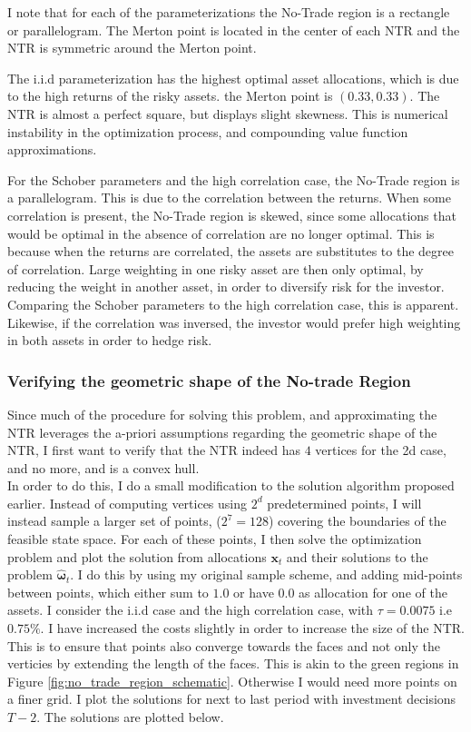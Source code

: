 \documentclass[11pt]{article}
\begin{document}
I note that for each of the parameterizations the No-Trade region is a rectangle or parallelogram.
The Merton point is located in the center of each \ac{NTR} and the \ac{NTR} is symmetric around the Merton point.

The i.i.d parameterization has the highest optimal asset allocations, which is due to the high returns of the risky assets. the Merton point is $(0.33, 0.33)$.
The NTR is almost a perfect square, but displays slight skewness. This is numerical instability in the optimization process, and compounding value function approximations.

For the Schober parameters and the high correlation case,
the No-Trade region is a parallelogram. This is due to the correlation between the returns. When some correlation is present, the No-Trade region is skewed,
since some allocations that would be optimal in the absence of correlation are no longer optimal. 
This is because when the returns are correlated, the assets are substitutes to the degree of correlation. 
Large weighting in one risky asset are then only optimal,
by reducing the weight in another asset, in order to diversify risk for the investor. Comparing the Schober parameters to the high correlation case, this is apparent.
Likewise, if the correlation was inversed, the investor would prefer high weighting in both assets in order to hedge risk. 

\subsubsection{Verifying the geometric shape of the No-trade Region}\label{Subsubsection: ConfirmShape}
Since much of the procedure for solving this problem, and approximating the \ac{NTR} leverages
the a-priori assumptions regarding the geometric shape of the \ac{NTR}, I first want to verify that the
\ac{NTR} indeed has $4$ vertices for the 2d case, and no more, and is a convex hull.\\
In order to do this, I do a small modification to the solution algorithm proposed earlier.
Instead of computing vertices using $2^{d}$ predetermined points, I will instead
sample a larger set of points, ($2^7 = 128$) covering the boundaries of the feasible state space.
For each of these points, I then solve the optimization problem
and plot the solution from allocations $\mathbf{x}_{t}$ and their solutions to the problem $\hat{\boldsymbol{\omega}}_{t}$.
I do this by using my original sample scheme, and adding mid-points between points,
which either sum to $1.0$ or have $0.0$ as allocation for one of the assets.
I consider the i.i.d case and the high correlation case, with $\tau = 0.0075$ i.e $0.75\%$. I have increased the costs slightly in order to increase the
size of the NTR. This is to ensure that points also converge towards the faces and not only the verticies by extending the length of the faces.
This is akin to the green regions in Figure \ref{fig:no_trade_region_schematic}.
Otherwise I would need more points on a finer grid. I plot the solutions for next to last period with investment decisions $T-2$.
The solutions are plotted below.
\end{document}
